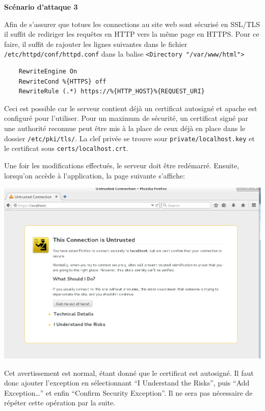 \documentclass{article}
\begin{document}
\textbf{Scénario d'attaque 3}

Afin de s'assurer que totues les connections au site web sont sécurisé
en SSL/TLS il suffit de rediriger les requêtes en HTTP vers la même page
en HTTPS. Pour ce faire, il suffit de rajouter les lignes suivantes dans
le fichier \texttt{/etc/httpd/conf/httpd.conf} dans la balise
\texttt{\textless{}Directory\ "/var/www/html"\textgreater{}}

\begin{verbatim}
    RewriteEngine On
    RewriteCond %{HTTPS} off
    RewriteRule (.*) https://%{HTTP_HOST}%{REQUEST_URI}
\end{verbatim}

Ceci est possible car le serveur contient déjà un certificat autosigné
et apache est configuré pour l'utiliser. Pour un maximum de sécurité, un
certificat signé par une authorité reconnue peut être mis à la place de
ceux déjà en place dans le dossier \texttt{/etc/pki/tls/}. La clef
privée se trouve sour \texttt{private/localhost.key} et le certificat
sous \texttt{certs/localhost.crt}.

Une foir les modifications effectués, le serveur doit être redémarré.
Ensuite, lorsqu'on accède à l'application, la page suivante s'affiche:

\includegraphics{images/ssl.PNG}

Cet avertissement est normal, étant donné que le certificat est
autosigné. Il faut donc ajouter l'exception en sélectionnant ``I
Understand the Risks'', puis ``Add Exception\ldots{}'' et enfin
``Confirm Security Exception''. Il ne sera pas nécessaire de répéter
cette opération par la suite.
\end{document}
